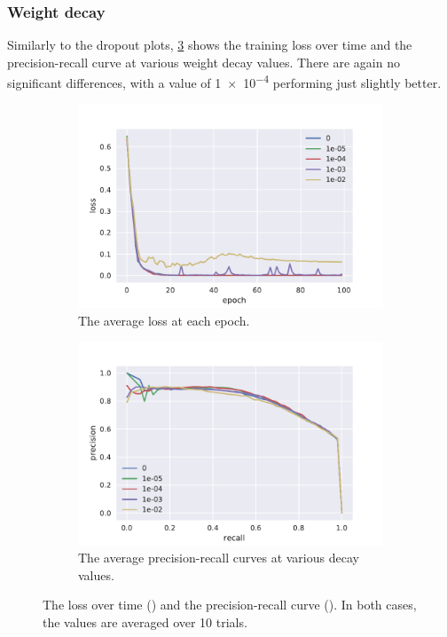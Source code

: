 \FloatBarrier%
\subsubsection{Weight decay}
Similarly to the dropout plots, \cref{fig:decay_plots} shows the training loss
over time and the precision-recall curve at various weight decay values. There
are again no significant differences, with a value of \num{1e-4} performing just
slightly better.

\begin{figure}[htbp]
  \centering
  \begin{subfigure}[t]{0.49\textwidth}
    \centering
    \includegraphics[width=\textwidth]{./figures/results/decay/losses.pdf}
    \caption{The average loss at each epoch.\\}%
    \label{fig:decay_loss}
  \end{subfigure}
  \begin{subfigure}[t]{0.49\textwidth}
    \centering
    \includegraphics[width=\textwidth]{./figures/results/decay/pr.pdf}
    \caption{The average precision-recall curves at various decay values.}%
    \label{fig:decay_pr}
  \end{subfigure}
  \caption{The loss over time () and the
    precision-recall curve (). In both cases, the values are
    averaged over 10 trials.}%
    \label{fig:decay_plots}
\end{figure}

